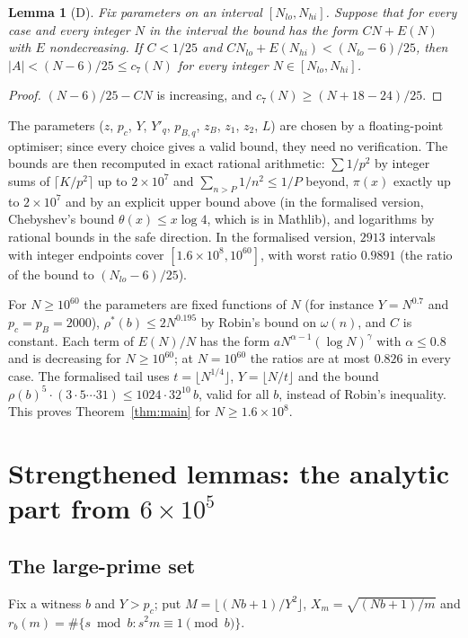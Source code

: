 \documentclass[11pt]{amsart}
\newtheorem{lemma}[theorem]{Lemma}
\theoremstyle{definition}
\theoremstyle{remark}
\begin{document}
\begin{lemma}[D]\label{lem:D}
Fix parameters on an interval $[N_{lo},N_{hi}]$. Suppose that for every case and
every integer $N$ in the interval the bound has the form $C N+E(N)$ with
$E$ nondecreasing. If $C<1/25$ and $CN_{lo}+E(N_{hi})<(N_{lo}-6)/25$, then
$|A|<(N-6)/25\le c_7(N)$ for every integer $N\in[N_{lo},N_{hi}]$.
\end{lemma}

\begin{proof}
$(N-6)/25-CN$ is increasing, and $c_7(N)\ge(N+18-24)/25$.
\end{proof}

The parameters ($z$, $p_c$, $Y$, $Y'_q$, $p_{B,q}$, $z_B$, $z_1$, $z_2$, $L$) are
chosen by a floating-point optimiser; since every choice gives a valid bound, they
need no verification. The bounds are then recomputed in exact rational arithmetic:
$\sum1/p^2$ by integer sums of $\lceil K/p^2\rceil$ up to $2\times10^7$ and
$\sum_{n>P}1/n^2\le1/P$ beyond, $\pi(x)$ exactly up to $2\times10^7$ and by an
explicit upper bound above (in the formalised version, Chebyshev's bound
$\theta(x)\le x\log4$, which is in Mathlib), and logarithms by rational bounds in the
safe direction. In the formalised version, $2913$ intervals with integer endpoints
cover $[1.6\times10^8,10^{60}]$, with worst ratio $0.9891$ (the ratio of the
bound to $(N_{lo}-6)/25$).

For $N\ge10^{60}$ the parameters are fixed functions of $N$ (for instance
$Y=N^{0.7}$ and $p_c=p_B=2000$), $\rho^*(b)\le2N^{0.195}$ by Robin's bound on
$\omega(n)$, and $C$ is constant. Each term of $E(N)/N$ has the form
$aN^{\alpha-1}(\log N)^\gamma$ with $\alpha\le0.8$ and is decreasing for
$N\ge10^{60}$; at $N=10^{60}$ the ratios are at most $0.826$ in every case. The
formalised tail uses $t=\lfloor N^{1/4}\rfloor$, $Y=\lfloor N/t\rfloor$ and the
bound $\rho(b)^5\cdot(3\cdot5\cdots31)\le1024\cdot32^{10}\,b$, valid for all $b$,
instead of Robin's inequality. This proves Theorem~\ref{thm:main} for
$N\ge1.6\times10^8$.

\section{Strengthened lemmas: the analytic part from $6\times10^5$}\label{sec:strong}

\subsection{The large-prime set}
Fix a witness $b$ and $Y>p_c$; put $M=\lfloor(Nb+1)/Y^2\rfloor$,
$X_m=\sqrt{(Nb+1)/m}$ and $r_b(m)=\#\{s\bmod b: s^2m\equiv1\pmod b\}$.
\end{document}
